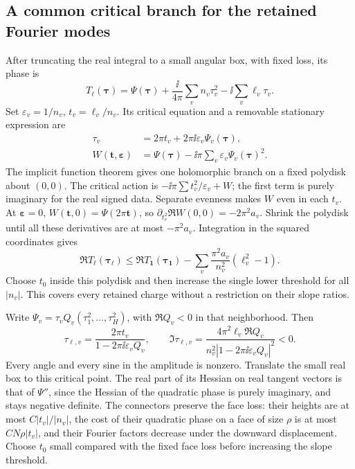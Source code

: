 \subsection{A common critical branch for the retained Fourier modes}
After truncating the real integral to a small angular box, with
fixed loss, its phase is
\[
 T_{\boldsymbol\ell}(\boldsymbol\tau)
 =\Psi(\boldsymbol\tau)
       +\frac{\ii}{4\pi}\sum_v n_v\tau_v^2
       -\ii\sum_v\ell_v\tau_v.
\]
Set $\varepsilon_v=1/n_v$, $t_v=\ell_v/n_v$. Its critical equation
and a removable stationary expression are
\begin{align}
 \tau_v&=2\pi t_v+2\pi\ii\varepsilon_v\Psi_v(\boldsymbol\tau),
       \label{ms:joint-critical}\\
 W(\mathbf t,\boldsymbol\varepsilon)
 &=\Psi(\boldsymbol\tau)
                -\ii\pi\sum_v\varepsilon_v\Psi_v(\boldsymbol\tau)^2.
\end{align}
The implicit function theorem gives one holomorphic branch on a
fixed polydisk about $(0,0)$. The critical action is
$-\ii\pi\sum t_v^2/\varepsilon_v+W$; the first term is purely
imaginary for the real signed data. Separate evenness makes $W$
even in each $t_v$. At $\boldsymbol\varepsilon=0$,
$W(\mathbf t,0)=\Psi(2\pi\mathbf t)$, so
$\partial_{t_v^2}\Re W(0,0)=-2\pi^2 a_v$.
Shrink the polydisk until all these derivatives are at most
$-\pi^2a_v$. Integration in the squared coordinates gives
\begin{equation}\label{ms:joint-loss}
 \Re T_{\boldsymbol\ell}(\boldsymbol\tau_{\boldsymbol\ell})
 \le\Re T_{\mathbf1}(\boldsymbol\tau_{\mathbf1})
       -\sum_v\frac{\pi^2a_v}{n_v^2}(\ell_v^2-1).
\end{equation}
Choose $t_0$ inside this polydisk and then increase the single
lower threshold for all $|n_v|$. This covers every retained charge
without a restriction on their slope ratios.

Write $\Psi_v=\tau_v Q_v(\tau_1^2,\ldots,\tau_H^2)$, with
$\Re Q_v<0$ in that neighborhood. Then
\begin{equation}\label{ms:critical-angle}
 \tau_{\boldsymbol\ell,v}=
 \frac{2\pi t_v}{1-2\pi\ii\varepsilon_v Q_v},\qquad
 \Im\tau_{\boldsymbol\ell,v}
 =\frac{4\pi^2\ell_v\Re Q_v}
              {n_v^2|1-2\pi\ii\varepsilon_vQ_v|^2}<0.
\end{equation}
Every angle and every sine in the amplitude is nonzero. Translate
the small real box to this critical point. The real part of its
Hessian on real tangent vectors is that of $\Psi''$, since the
Hessian of the quadratic phase is purely imaginary, and stays negative definite.
The connectors preserve the face loss: their heights are at most
$C|t_v|/|n_v|$, the cost of their quadratic phase on a face of size $\rho$ is at
most $CN\rho|t_v|$, and their Fourier factors decrease under the
downward displacement. Choose $t_0$ small compared with the fixed
face loss before increasing the slope threshold.

